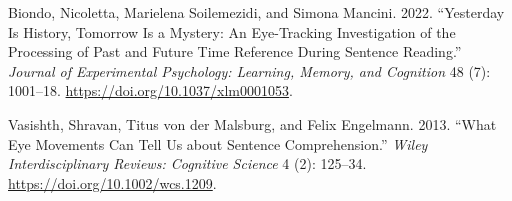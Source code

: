 \documentclass[
  letterpaper,
  DIV=11,
  numbers=noendperiod]{scrartcl}
\newlength{\cslhangindent}
\newlength{\cslentryspacingunit} %
\newenvironment{CSLReferences}[2] %
 {%
  \setlength{\parindent}{0pt}
  \ifodd #1
  \let\oldpar\par
  \def\par{\hangindent=\cslhangindent\oldpar}
  \fi
  \setlength{\parskip}{#2\cslentryspacingunit}
 }%
 {}
\begin{document}
\hypertarget{refs}{}
\begin{CSLReferences}{1}{0}
\leavevmode{}%
Biondo, Nicoletta, Marielena Soilemezidi, and Simona Mancini. 2022.
{``Yesterday Is History, Tomorrow Is a Mystery: An Eye-Tracking
Investigation of the Processing of Past and Future Time Reference During
Sentence Reading.''} \emph{Journal of Experimental Psychology: Learning,
Memory, and Cognition} 48 (7): 1001--18.
\url{https://doi.org/10.1037/xlm0001053}.

\leavevmode{}%
Vasishth, Shravan, Titus von der Malsburg, and Felix Engelmann. 2013.
{``What Eye Movements Can Tell Us about Sentence Comprehension.''}
\emph{Wiley Interdisciplinary Reviews: Cognitive Science} 4 (2):
125--34. \url{https://doi.org/10.1002/wcs.1209}.

\end{CSLReferences}
\end{document}
